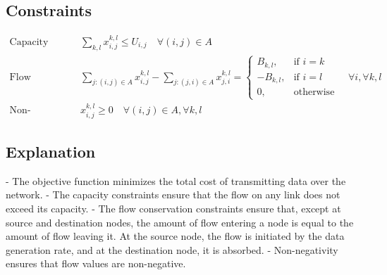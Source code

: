 \documentclass{article}
\begin{document}
\subsection*{Constraints}
\begin{align*}
\text{Capacity Constraints: } & \sum_{k,l} x_{i,j}^{k,l} \leq U_{i,j} \quad \forall (i,j) \in A \\
\text{Flow Conservation: } & \sum_{j: (i,j) \in A} x_{i,j}^{k,l} - \sum_{j: (j,i) \in A} x_{j,i}^{k,l} = 
\begin{cases} 
B_{k,l}, & \text{if } i = k \\
-B_{k,l}, & \text{if } i = l \\
0, & \text{otherwise}
\end{cases}
\quad \forall i, \forall k, l \\
\text{Non-negativity: } & x_{i,j}^{k,l} \geq 0 \quad \forall (i,j) \in A, \forall k, l
\end{align*}

\subsection*{Explanation}
- The objective function minimizes the total cost of transmitting data over the network.
- The capacity constraints ensure that the flow on any link does not exceed its capacity.
- The flow conservation constraints ensure that, except at source and destination nodes, the amount of flow entering a node is equal to the amount of flow leaving it. At the source node, the flow is initiated by the data generation rate, and at the destination node, it is absorbed.
- Non-negativity ensures that flow values are non-negative.
\end{document}
